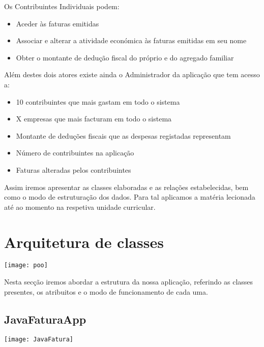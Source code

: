 \documentclass[10pt,a4paper]{article}
\begin{document}
 \noindent Os Contribuintes Individuais podem:
\begin{itemize}
 \item Aceder às faturas emitidas
 \item Associar e alterar a atividade económica às faturas emitidas em seu nome
 \item Obter o montante de dedução fiscal do próprio e do agregado familiar
\end{itemize}

 \noindent Além destes dois atores existe ainda o Administrador da aplicação que tem acesso a:
\begin{itemize}
 \item 10 contribuintes que mais gastam em todo o sistema
 \item X empresas que mais facturam em todo o sistema
 \item Montante de deduções fiscais que as despesas registadas representam
 \item Número de contribuintes na aplicação
 \item Faturas alteradas pelos contribuintes
\end{itemize}

 \noindent Assim iremos apresentar as classes elaboradas e as relações estabelecidas, bem como o modo de estruturação dos dados. Para tal aplicamos a matéria lecionada até ao momento na respetiva unidade curricular.

\cleardoublepage

\section{Arquitetura de classes}
\label{sec:solucao}


\begin{center}
\graphicspath{ {/home/jessica/Desktop/} }
\texttt{[image: poo]}\\
\end{center}

Nesta secção iremos abordar a estrutura da nossa aplicação, referindo as classes presentes, os atribuitos e o modo de funcionamento de cada uma.

\subsection{JavaFaturaApp}

\begin{center}
\graphicspath{ {/home/jessica/Desktop/} }
\texttt{[image: JavaFatura]}\\
\end{center}
\end{document}

